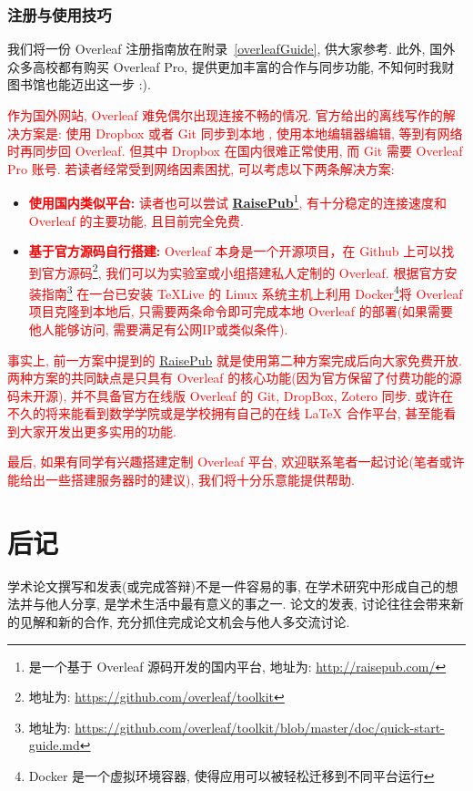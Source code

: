 \documentclass{formatBook}
\newcommand{\XG}[1]{\textcolor{red}{#1}}
\begin{document}
\subsection{注册与使用技巧}
我们将一份 Overleaf 注册指南放在附录~\ref{overleafGuide}, 供大家参考. 此外, 国外众多高校都有购买 Overleaf Pro, 提供更加丰富的合作与同步功能, 不知何时我财图书馆也能迈出这一步 :).

\XG{作为国外网站, Overleaf 难免偶尔出现连接不畅的情况. 官方给出的离线写作的解决方案是: 使用 Dropbox 或者 Git 同步到本地 , 使用本地编辑器编辑, 等到有网络时再同步回 Overleaf. 但其中 Dropbox 在国内很难正常使用, 而 Git 需要 Overleaf Pro 账号. 若读者经常受到网络因素困扰, 可以考虑以下两条解决方案:}

\begin{itemize}
    \item \XG{\textbf{使用国内类似平台:} 读者也可以尝试 \textbf{\href{http://raisepub.com/}{RaisePub}}\footnote{是一个基于 Overleaf 源码开发的国内平台, 地址为: \url{http://raisepub.com/}}, 有十分稳定的连接速度和 Overleaf 的主要功能, 且目前完全免费.}
    \item \XG{\textbf{基于官方源码自行搭建:} Overleaf 本身是一个开源项目，在 Github 上可以找到官方源码\footnote{地址为: \url{https://github.com/overleaf/toolkit}}, 我们可以为实验室或小组搭建私人定制的 Overleaf. 根据官方安装指南\footnote{地址为: \url{https://github.com/overleaf/toolkit/blob/master/doc/quick-start-guide.md}} 在一台已安装 TeXLive 的 Linux 系统主机上利用 Docker\footnote{Docker 是一个虚拟环境容器, 使得应用可以被轻松迁移到不同平台运行}将 Overleaf 项目克隆到本地后, 只需要两条命令即可完成本地 Overleaf 的部署(如果需要他人能够访问, 需要满足有公网IP或类似条件).}
\end{itemize}

\XG{事实上, 前一方案中提到的 \href{http://raisepub.com/}{RaisePub} 就是使用第二种方案完成后向大家免费开放. 两种方案的共同缺点是只具有 Overleaf 的核心功能(因为官方保留了付费功能的源码未开源), 并不具备官方在线版 Overleaf 的 Git, DropBox, Zotero 同步. 或许在不久的将来能看到数学学院或是学校拥有自己的在线 LaTeX 合作平台, 甚至能看到大家开发出更多实用的功能. }

\XG{最后, 如果有同学有兴趣搭建定制 Overleaf 平台, 欢迎联系笔者一起讨论(笔者或许能给出一些搭建服务器时的建议), 我们将十分乐意能提供帮助.}

\chapter{后记}
学术论文撰写和发表(或完成答辩)不是一件容易的事, 在学术研究中形成自己的想法并与他人分享, 是学术生活中最有意义的事之一. 论文的发表, 讨论往往会带来新的见解和新的合作, 充分抓住完成论文机会与他人多交流讨论.
\end{document}
